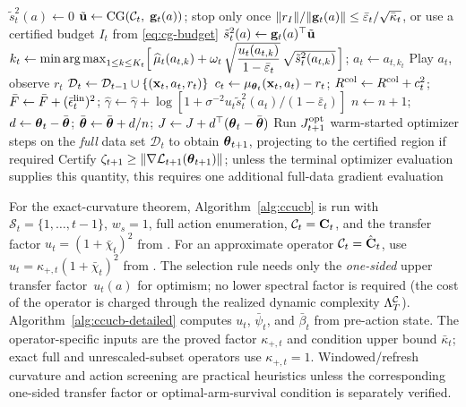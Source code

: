 \begin{algorithm}[H]
\begin{algorithmic}[1]
      \STATE $\tilde{s}_t^2(a) \gets 0$ \hfill{}
    \ELSE
      \STATE $\tilde{\mathbf{u}} \gets \mathrm{CG}(\mathcal{C}_t,\;\mathbf{g}_t(a))$; stop only once
           $\|r_I\|/\|\mathbf{g}_t(a)\| \le \bar\varepsilon_t/\sqrt{\bar\kappa_t}$,
           or use a certified budget $I_t$ from \eqref{eq:cg-budget}
        \hfill{} \label{line:cg-detailed}
      \STATE $\tilde{s}_t^2(a) \gets \mathbf{g}_t(a)^\top \tilde{\mathbf{u}}$
        \hfill{}
    \ENDIF
  \ENDFOR
  \STATE $k_t\gets\min\operatorname*{arg\,max}_{1\le k\le K_t}
    \Bigl[\,\widehat\mu_t(a_{t,k})
    + \omega_t\,\sqrt{\dfrac{u_t(a_{t,k})}{1-\bar\varepsilon_t}}\,
      \sqrt{\tilde{s}_t^2(a_{t,k})}\,\Bigr]$;
      $a_t\gets a_{t,k_t}$
      \hfill{} \label{line:ucb-detailed}
  \STATE Play $a_t$, observe $r_t$
  \STATE $\mathcal{D}_t \gets \mathcal{D}_{t-1} \cup \{(\mathbf{x}_t, a_t, r_t)\}$
  \STATE $c_t\gets\mu_{\boldsymbol{\theta}_t}(\mathbf{x}_t,a_t)-r_t$;
         $R^{\rm col}\gets R^{\rm col}+c_t^2$;
         $\bar F\gets\bar F+(\bar\epsilon_t^{\rm lin})^2$;
         $\hat\gamma\gets\hat\gamma+\log[1+\sigma^{-2}
         u_t\tilde s_t^2(a_t)/(1-\bar\varepsilon_t)]$
  \STATE $n\gets n+1$; $d\gets\boldsymbol{\theta}_t-\bar{\boldsymbol{\theta}}$;
         $\bar{\boldsymbol{\theta}}\gets\bar{\boldsymbol{\theta}}+d/n$;
         $J\gets J+d^\top(\boldsymbol{\theta}_t-\bar{\boldsymbol{\theta}})$
         \hfill{}
  \STATE Run $J^{\rm opt}_{t+1}$ warm-started optimizer steps on the
         \emph{full} data set $\mathcal D_t$ to obtain $\boldsymbol{\theta}_{t+1}$,
         projecting to the certified region if required
  \STATE Certify
         $\zeta_{t+1}\ge\|\nabla\mathcal{L}_{t+1}(\boldsymbol{\theta}_{t+1})\|$; unless the
         terminal optimizer evaluation supplies this quantity, this requires
         one additional full-data gradient evaluation
\ENDFOR
\end{algorithmic}
\end{algorithm}

For the exact-curvature theorem, Algorithm~\ref{alg:ccucb} is run with
$\mathcal{S}_t=\{1,\ldots,t{-}1\}$, $w_s=1$, full action enumeration,
$\mathcal{C}_t=\mathbf{C}_t$, and the transfer factor $u_t=(1+\bar\chi_t)^2$ from
.  For an approximate operator $\mathcal{C}_t=\hat{\mathbf{C}}_t$, use
$u_t=\kappa_{+,t}(1+\bar\chi_t)^2$ from .
The selection rule needs only the \emph{one-sided} upper transfer
factor~$u_t(a)$ for optimism; no lower spectral factor is required (the cost
of the operator is charged through the realized dynamic complexity
$\Lambda^{\mathcal{C}}_T$).  Algorithm~\ref{alg:ccucb-detailed} computes $u_t$,
$\bar\psi_t$, and $\bar\beta_t$ from pre-action state.  The
operator-specific inputs are the proved factor $\kappa_{+,t}$ and condition
upper bound $\bar\kappa_t$; exact full and unrescaled-subset operators use
$\kappa_{+,t}=1$.
Windowed/refresh curvature and action screening are practical heuristics
unless the corresponding one-sided transfer factor or optimal-arm-survival
condition is separately verified.

